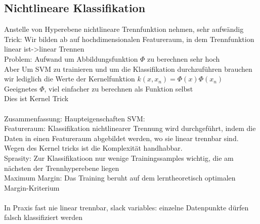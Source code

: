 \documentclass[a4paper,10pt,oneside]{article}
\begin{document}
\subsection{Nichtlineare Klassifikation}
Anstelle von Hyperebene nichtlineare Trennfunktion nehmen, sehr aufwändig\\
Trick: Wir bilden ab auf hochdimensionalen Featureraum, in dem Trennfunktion linear ist->linear Trennen\\
Problem: Aufwand um Abbildungsfunktion $\Phi$ zu berechnen sehr hoch\\
Aber Um SVM zu trainieren und um die Klassifikation durchzuführen brauchen wir lediglich die Werte der Kernelfunktion $k(x,x_n) = \Phi(x) \Phi(x_n)$\\
Geeignetes $\Phi$, viel einfacher zu berechnen als Funktion selbst\\
Dies ist Kernel Trick\\
\\
Zusammenfassung: Haupteigenschaften SVM:\\
Featureraum: Klassifikation nichtlinearer Trennung wird durchgeführt, indem die Daten in einen Featureraum abgebildet werden, wo sie linear trennbar sind. Wegen des Kernel tricks ist die Komplexität handhabbar.\\
Sprasity: Zur Klassifikatioon nur wenige Trainingssamples wichtig, die am nächsten der Trennhyperebene liegen\\
Maximum Margin: Das Training beruht auf dem lerntheoretisch optimalen Margin-Kriterium\\ \\
In Praxis fast nie linear trennbar, slack variables: einzelne Datenpunkte dürfen falsch klassifiziert werden
\end{document}

